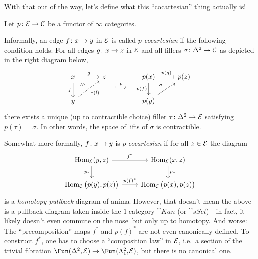 With that out of the way, let's define what this \enquote{cocartesian} thing actually is!
\begin{defi}\label{def:WeirdCocartesianDefinition}
	Let $p\colon \Ee\morphism\Cc$ be a functor of $\infty$ categories.
	\begin{alphanumerate}
		\item Informally, an edge $f\colon x\morphism y$ in $\mathcal{E}$ is called \emph{$p$-cocartesian} if the following condition holds: For all edges $g\colon x\morphism z$ in $\mathcal{E}$ and all fillers $\sigma\colon \Delta^2\morphism \Cc$ as depicted in the right diagram below,
		\begin{equation*}
			\begin{tikzcd}
				\vphantom{p(x)}x\rar["g"]\dar["f"']\drar[phantom,pos=0.25,"\scriptscriptstyle/\!/\!/"] & z\\
				y \urar[dashed,"\exists(!)"'] & \phantom{p(y)}
			\end{tikzcd}\overset{p}{\longmapsto}\quad
			\begin{tikzcd}
				p(x)\rar["p(g)"]\dar["p(f)"']\drar[phantom,pos=0.15,"\scriptstyle\sigma"] & p(z)\\
				p(y) \urar & \phantom{b}
			\end{tikzcd}
		\end{equation*}
		there exists a unique (up to contractible choice) filler $\tau\colon \Delta^2\morphism\Ee$ satisfying $p(\tau)=\sigma$. In other words, the space of lifts of $\sigma$ is contractible.
		
		Somewhat more formally, $f\colon x\morphism y$ is \emph{$p$-cocartesian} if for all $z\in \mathcal{E}$ the diagram
		\begin{equation*}
			\begin{tikzcd}
				\Hom_\Ee(y,z)\rar["f^*"]\dar["p_*"'] & \Hom_\Ee(x,z)\dar["p_*"]\\
				\Hom_\Cc\big(p(y),p(z)\big)\rar["p(f)^*"] & \Hom_\Cc\big(p(x),p(z)\big)
			\end{tikzcd}
		\end{equation*}
		is a \emph{homotopy pullback} diagram of anima. However, that doesn't mean the above is a pullback diagram taken inside the $1$-category $\cat{Kan}$ (or $\cat{sSet}$)---in fact, it likely doesn't even commute on the nose, but only up to homotopy. And worse: The \enquote{precomposition} maps $f^*$ and $p(f)^*$ are not even canonically defined. To construct $f^*$, one has to choose a \enquote{composition law} in $\mathcal{E}$, i.e.\ a section of the trivial fibration $\Fun(\Delta^2,\Ee)\morphism\Fun(\Lambda_1^2,\Ee)$, but there is no canonical one.
		

\end{alphanumerate}
\end{defi}

